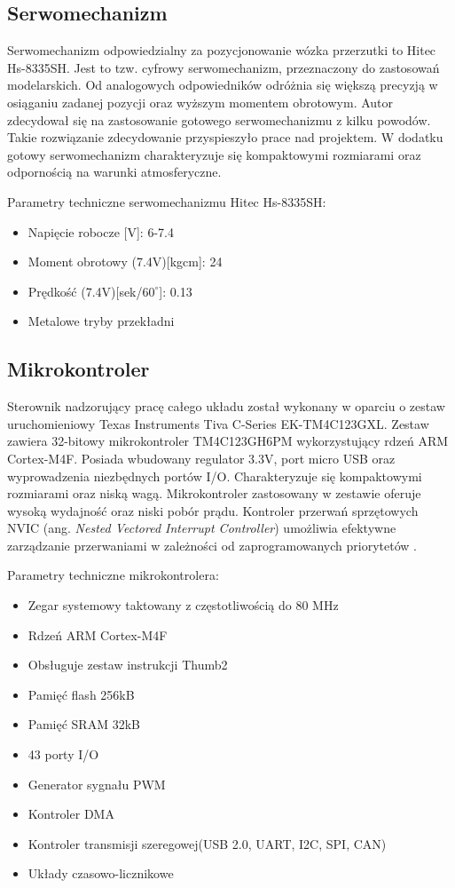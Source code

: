 \subsection{Serwomechanizm}
Serwomechanizm odpowiedzialny za pozycjonowanie wózka przerzutki to Hitec Hs-8335SH. Jest to tzw. cyfrowy serwomechanizm, przeznaczony do zastosowań modelarskich. Od analogowych odpowiedników odróżnia się większą precyzją w osiąganiu zadanej pozycji oraz wyższym momentem obrotowym. Autor zdecydował się na zastosowanie gotowego serwomechanizmu z kilku powodów. Takie rozwiązanie zdecydowanie przyspieszyło prace nad projektem. W dodatku gotowy serwomechanizm charakteryzuje się kompaktowymi rozmiarami oraz odpornością na warunki atmosferyczne.  

Parametry techniczne serwomechanizmu Hitec Hs-8335SH:
\begin{itemize}
\item
Napięcie robocze [V]: 6-7.4
\item
Moment obrotowy (7.4V)[kgcm]: 24
\item
Prędkość (7.4V)[sek/$60^{\circ}$]: 0.13
\item
Metalowe tryby przekładni
\end{itemize} 
\label{serwo}
\subsection{Mikrokontroler}
Sterownik nadzorujący pracę całego układu został wykonany w oparciu o zestaw uruchomieniowy Texas Instruments Tiva C-Series EK-TM4C123GXL. Zestaw zawiera 32-bitowy mikrokontroler TM4C123GH6PM wykorzystujący rdzeń ARM Cortex-M4F. Posiada wbudowany regulator 3.3V, port micro USB oraz wyprowadzenia niezbędnych portów I/O. Charakteryzuje się kompaktowymi rozmiarami oraz niską wagą. Mikrokontroler zastosowany w zestawie 	oferuje wysoką wydajność oraz niski pobór prądu. Kontroler przerwań sprzętowych NVIC (ang. {\em Nested Vectored Interrupt Controller}) umożliwia efektywne zarządzanie przerwaniami w zależności od zaprogramowanych priorytetów \cite{tiva}.

Parametry techniczne mikrokontrolera:
\begin{itemize}
\item
Zegar systemowy taktowany z częstotliwością do 80 MHz
\item
Rdzeń ARM Cortex-M4F
\item 
Obsługuje zestaw instrukcji Thumb2
\item
Pamięć flash 256kB
\item
Pamięć SRAM 32kB
\item
43 porty I/O
\item
Generator sygnału PWM
\item
Kontroler DMA
\item
Kontroler transmisji szeregowej(USB 2.0, UART, I2C, SPI, CAN)
\item
Układy czasowo-licznikowe
\end{itemize} 
